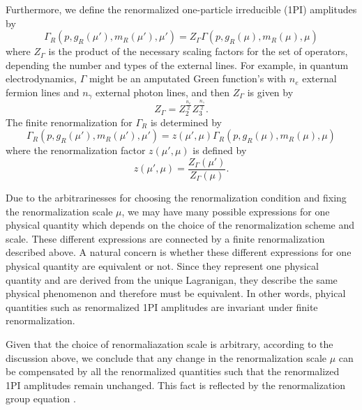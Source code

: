 Furthermore, we define the renormalized one-particle irreducible (1PI) amplitudes by
\begin{equation}
\Gamma_R(p,g_R(\mu'),m_R(\mu'),\mu')=Z_{\Gamma}\Gamma(p,g_R(\mu),m_R(\mu),\mu)
\end{equation}
where $Z_\Gamma$ is the product of the necessary scaling factors for the set of operators, depending the number and types of the external lines. For example, in quantum electrodynamics, $\Gamma$ might be an amputated Green function's with $n_e$ external fermion lines and $n_\gamma$ external photon lines, and then $Z_\Gamma$ is given by
\begin{equation}
Z_\Gamma=Z_2^\frac{n_e}{2}Z_3^\frac{n_\gamma}{2}.
\end{equation}
The finite renormalization for $\Gamma_R$ is determined by
\begin{equation}
\Gamma_R(p,g_R(\mu'),m_R(\mu'),\mu')=z(\mu',\mu)\Gamma_R(p,g_R(\mu),m_R(\mu),\mu)
\end{equation}
where the renormalization factor $z(\mu',\mu)$ is defined by
\begin{equation}
z(\mu',\mu)=\frac{Z_\Gamma(\mu')}{Z_\Gamma(\mu)}.
\end{equation}

Due to the arbitrarinesses for choosing the renormalization condition and fixing the renormalization scale $\mu$, we may have many possible expressions for one physical quantity which depends on the choice of the renormalization scheme and scale. These different expressions are connected  by a finite renormalization described above. A natural concern is whether these different expressions for one physical quantity are equivalent or not. Since they represent one physical quantity and are derived from the unique Lagranigan, they describe the same physical phenomenon and therefore must be equivalent. In other words, phyical quantities such as renormalized 1PI amplitudes are invariant under finite renormalization. 

Given that the choice of renormaliazation scale is arbitrary, according to the discussion above, we conclude that any change in the renormalization scale $\mu$ can be compensated by all the renormalized quantities such that the renormalized 1PI amplitudes remain unchanged. This fact is reflected by the renormalization group equation \cite{MS,GelRGE,CallanRGE,SymRGE,WeiRGE}.

